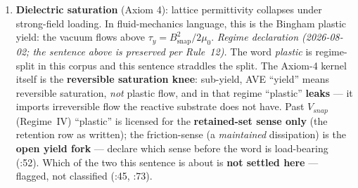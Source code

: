 \begin{enumerate}
    \item \textbf{Dielectric saturation} (Axiom 4): lattice permittivity
          collapses under strong-field loading.  In fluid-mechanics language,
          this is the Bingham plastic yield: the vacuum flows above
          $\tau_y = B_\text{snap}^2/2\mu_0$.
          \emph{Regime declaration (2026-08-02; the sentence above is preserved
          per Rule~12).} The word \emph{plastic} is regime-split in this corpus
          and this sentence straddles the split. The Axiom-4 kernel itself is the
          \textbf{reversible saturation knee}: sub-yield, AVE ``yield'' means
          reversible saturation, \emph{not} plastic flow, and in that regime
          ``plastic'' \textbf{leaks} --- it imports irreversible flow the
          reactive substrate does not have. Past $V_{snap}$ (Regime~IV) ``plastic'' is licensed for the
          \textbf{retained-set sense only} (the retention row as written); the
          friction-sense (a \emph{maintained} dissipation) is the \textbf{open
          yield fork} --- declare which sense before the word is load-bearing
          (:52). Which of the two this sentence is about is
          \textbf{not settled here} --- flagged, not classified
          (:45, :73).

\end{enumerate}
